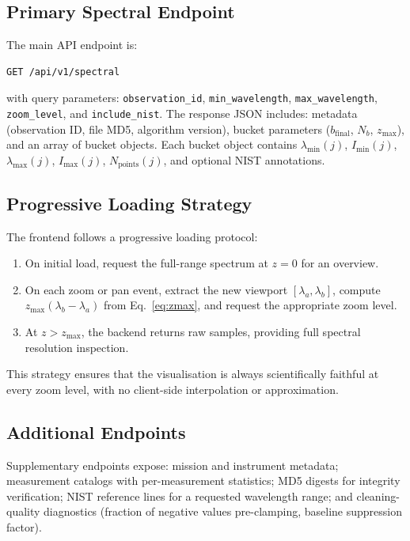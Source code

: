 \documentclass[a4paper,twocolumn,10pt]{article}
\begin{document}
\subsection{Primary Spectral Endpoint}

The main API endpoint is:

\begin{verbatim}
GET /api/v1/spectral
\end{verbatim}

with query parameters: \texttt{observation\_id},
\texttt{min\_wavelength}, \texttt{max\_wavelength},
\texttt{zoom\_level}, and \texttt{include\_nist}.  The response JSON
includes: metadata (observation ID, file MD5, algorithm version),
bucket parameters ($b_{\text{final}}$, $N_b$, $z_{\max}$), and an
array of bucket objects.  Each bucket object contains
$\lambda_{\min}(j)$, $I_{\min}(j)$, $\lambda_{\max}(j)$,
$I_{\max}(j)$, $N_{\text{points}}(j)$, and optional NIST annotations.

\subsection{Progressive Loading Strategy}

The frontend follows a progressive loading protocol:
\begin{enumerate}[nosep,leftmargin=*]
  \item On initial load, request the full-range spectrum at $z = 0$
    for an overview.
  \item On each zoom or pan event, extract the new viewport
    $[\lambda_a, \lambda_b]$, compute $z_{\max}(\lambda_b -
    \lambda_a)$ from Eq.~\eqref{eq:zmax}, and request the
    appropriate zoom level.
  \item At $z > z_{\max}$, the backend returns raw samples,
    providing full spectral resolution inspection.
\end{enumerate}

This strategy ensures that the visualisation is always scientifically
faithful at every zoom level, with no client-side interpolation or
approximation.

\subsection{Additional Endpoints}

Supplementary endpoints expose: mission and instrument metadata;
measurement catalogs with per-measurement statistics; MD5 digests for
integrity verification; NIST reference lines for a requested
wavelength range; and cleaning-quality diagnostics (fraction of
negative values pre-clamping, baseline suppression factor).
\end{document}
